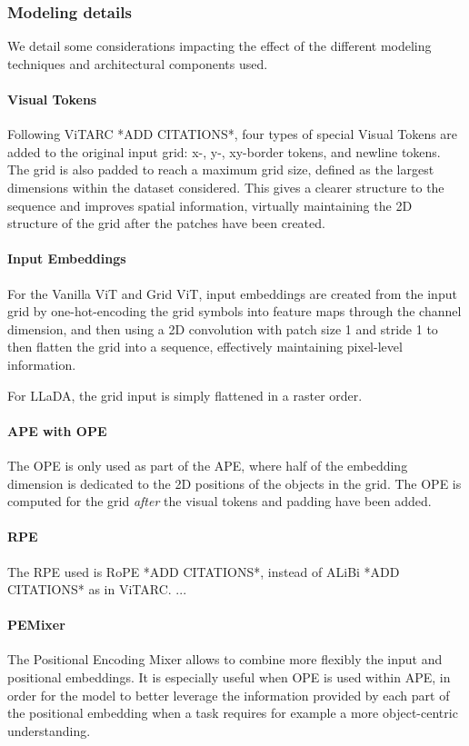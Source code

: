\subsubsection{Modeling details}
We detail some considerations impacting the effect of the different modeling techniques and architectural components used. 

\paragraph{Visual Tokens}
Following ViTARC *ADD CITATIONS*, four types of special Visual Tokens are added to the original input grid: x-, y-, xy-border tokens, and newline tokens. The grid is also padded to reach a maximum grid size, defined as the largest dimensions within the dataset considered. This gives a clearer structure to the sequence and improves spatial information, virtually maintaining the 2D structure of the grid after the patches have been created.

\paragraph{Input Embeddings}
For the Vanilla ViT and Grid ViT, input embeddings are created from the input grid by one-hot-encoding the grid symbols into feature maps through the channel dimension, and then using a 2D convolution with patch size 1 and stride 1 to then flatten the grid into a sequence, effectively maintaining pixel-level information.

For LLaDA, the grid input is simply flattened in a raster order.

\paragraph{APE with OPE}
The OPE is only used as part of the APE, where half of the embedding dimension is dedicated to the 2D positions of the objects in the grid. The OPE is computed for the grid \textit{after} the visual tokens and padding have been added.

\paragraph{RPE}
The RPE used is RoPE *ADD CITATIONS*, instead of ALiBi *ADD CITATIONS* as in ViTARC. ...

\paragraph{PEMixer}
The Positional Encoding Mixer allows to combine more flexibly the input and positional embeddings. It is especially useful when OPE is used within APE, in order for the model to better leverage the information provided by each part of the positional embedding when a task requires for example a more object-centric understanding.

